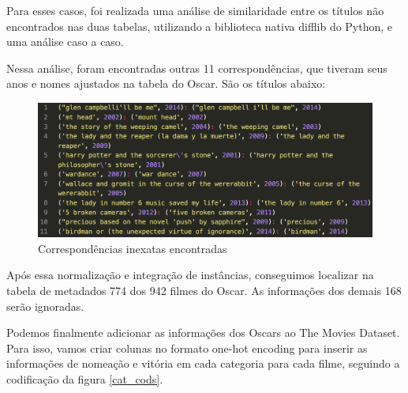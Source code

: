             Para esses casos, foi realizada uma análise de similaridade entre os títulos não encontrados nas duas tabelas, utilizando a biblioteca nativa difflib do Python, e uma análise caso a caso.
            
            Nessa análise, foram encontradas outras 11 correspondências, que tiveram seus anos e nomes ajustados na tabela do Oscar. São os títulos abaixo:\newline
            
            \begin{figure}[htb]
            	\caption{\label{corresp}Correspondências inexatas encontradas}
            	\begin{center}
            		\includegraphics[scale=0.35]{corresp.png}
            	\end{center}
            \end{figure}
            
            Após essa normalização e integração de instâncias, conseguimos localizar na tabela de metadados 774 dos 942 filmes do Oscar. As informações dos demais 168 serão ignoradas.

            Podemos finalmente adicionar as informações dos Oscars ao The Movies Dataset. Para isso, vamos criar colunas no formato one-hot encoding para inserir as informações de nomeação e vitória em cada categoria para cada filme, seguindo a codificação da figura \ref{cat_cods}.
            
